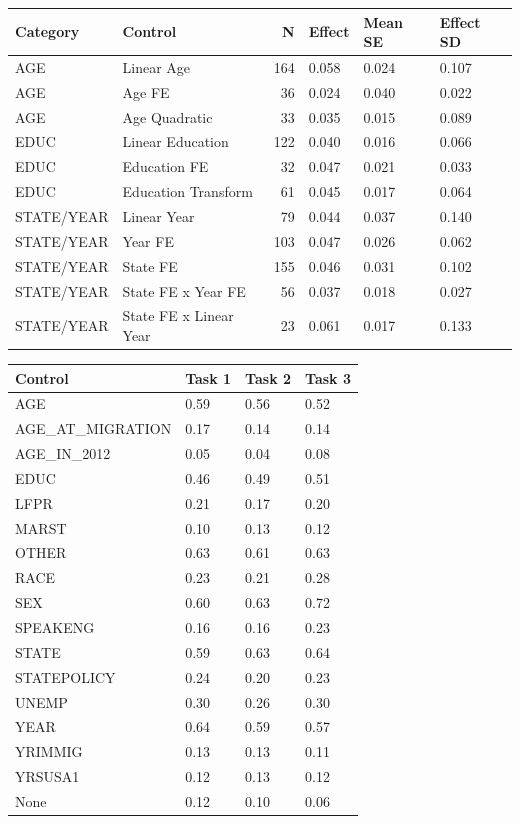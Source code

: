 \documentclass[
  letterpaper,
  DIV=11,
  numbers=noendperiod]{scrartcl}
\begin{document}
\begin{longtable}[]{@{}llrlll@{}}
\toprule\noalign{}
Category & Control & N & Effect & Mean SE & Effect SD \\
\midrule\noalign{}
\endhead
\bottomrule\noalign{}
\endlastfoot
AGE & Linear Age & 164 & 0.058 & 0.024 & 0.107 \\
AGE & Age FE & 36 & 0.024 & 0.040 & 0.022 \\
AGE & Age Quadratic & 33 & 0.035 & 0.015 & 0.089 \\
EDUC & Linear Education & 122 & 0.040 & 0.016 & 0.066 \\
EDUC & Education FE & 32 & 0.047 & 0.021 & 0.033 \\
EDUC & Education Transform & 61 & 0.045 & 0.017 & 0.064 \\
STATE/YEAR & Linear Year & 79 & 0.044 & 0.037 & 0.140 \\
STATE/YEAR & Year FE & 103 & 0.047 & 0.026 & 0.062 \\
STATE/YEAR & State FE & 155 & 0.046 & 0.031 & 0.102 \\
STATE/YEAR & State FE x Year FE & 56 & 0.037 & 0.018 & 0.027 \\
STATE/YEAR & State FE x Linear Year & 23 & 0.061 & 0.017 & 0.133 \\
\end{longtable}

\begin{longtable}[]{@{}llll@{}}
\toprule\noalign{}
Control & Task 1 & Task 2 & Task 3 \\
\midrule\noalign{}
\endhead
\bottomrule\noalign{}
\endlastfoot
AGE & 0.59 & 0.56 & 0.52 \\
AGE\_AT\_MIGRATION & 0.17 & 0.14 & 0.14 \\
AGE\_IN\_2012 & 0.05 & 0.04 & 0.08 \\
EDUC & 0.46 & 0.49 & 0.51 \\
LFPR & 0.21 & 0.17 & 0.20 \\
MARST & 0.10 & 0.13 & 0.12 \\
OTHER & 0.63 & 0.61 & 0.63 \\
RACE & 0.23 & 0.21 & 0.28 \\
SEX & 0.60 & 0.63 & 0.72 \\
SPEAKENG & 0.16 & 0.16 & 0.23 \\
STATE & 0.59 & 0.63 & 0.64 \\
STATEPOLICY & 0.24 & 0.20 & 0.23 \\
UNEMP & 0.30 & 0.26 & 0.30 \\
YEAR & 0.64 & 0.59 & 0.57 \\
YRIMMIG & 0.13 & 0.13 & 0.11 \\
YRSUSA1 & 0.12 & 0.13 & 0.12 \\
None & 0.12 & 0.10 & 0.06 \\
\end{longtable}
\end{document}
